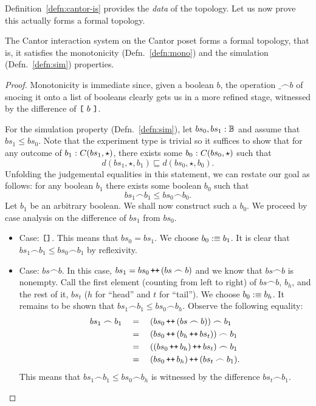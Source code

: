 Definition~\ref{defn:cantor-is} provides the \emph{data} of the topology. Let us now prove
this actually forms a formal topology.
\begin{thm}\label{thm:cantor-topo}
  The Cantor interaction system on the Cantor poset forms a formal topology, that is, it
  satisfies the monotonicity (Defn.~\ref{defn:mono}) and the simulation
  (Defn.~\ref{defn:sim}) properties.
\end{thm}
\begin{proof}
  Monotonicity is immediate since, given a boolean $b$, the operation $\_ \frown b$ of snocing
  it onto a list of booleans clearly gets us in a more refined stage, witnessed by the
  difference of $\text{\texttt{[}}~b~\text{\texttt{]}}$.

  For the simulation property (Defn.~\ref{defn:sim}), let
  $bs_0, bs_1:\mathbb{B}{}$ and assume that $bs_1 \le bs_0$. Note that the
  experiment type is trivial so it suffices to show that for any outcome of
  $b_1\hspace{0.1mm}:\hspace{0.1mm}C(bs_1, \star)$, there exists some $b_0\hspace{0.1mm}:\hspace{0.1mm}C(bs_0, \star)$ such that
  \begin{equation*}
    d(bs_1, \star, b_1) \sqsubseteq d(bs_0, \star, b_0).
  \end{equation*}
  Unfolding the judgemental equalities in this statement, we can restate our goal as
  follows: for any boolean $b_1$ there exists some boolean $b_0$ such that
  \begin{equation*}
    bs_1 \frown b_1 \le bs_0 \frown b_0.
  \end{equation*}
  Let $b_1$ be an arbitrary boolean. We shall now construct such a $b_0$. We proceed by
  case analysis on the difference of $bs_1$ from $bs_0$.
  \begin{itemize}
    \item Case: $\text{\texttt{[]}}{}$. This means that $bs_0 = bs_1$. We choose
      $b_0 :\equiv b_1$. It is clear that $bs_1 \frown b_1 \le bs_0 \frown b_1$ by reflexivity.
    \item Case: $bs \frown b$. In this case, $bs_1 = bs_0 \operatorname{\textnormal{\texttt{++}}}{} (bs \frown b)$ and we know that
      $bs \frown b$ is nonempty. Call the first element (counting from left to right) of $bs \frown
      b$, $b_h$, and the rest of it, $bs_t$ ($h$ for ``head'' and $t$ for ``tail''). We
      choose $b_0 :\equiv b_h$. It remains to be shown that $bs_1 \frown b_1 \le bs_0 \frown b_h$. Observe
      the following equality:
      \begin{align*}
        bs_1 \frown b_1 \quad&=\quad (bs_0 \operatorname{\textnormal{\texttt{++}}}{} (bs \frown b)) \frown b_1             \\
                   \quad&=\quad (bs_0 \operatorname{\textnormal{\texttt{++}}}{} (b_h \operatorname{\textnormal{\texttt{++}}}{} bs_t)) \frown b_1 \\
                   \quad&=\quad ((bs_0 \operatorname{\textnormal{\texttt{++}}}{} b_h) \operatorname{\textnormal{\texttt{++}}}{} bs_t) \frown b_1 \\
                   \quad&=\quad (bs_0 \operatorname{\textnormal{\texttt{++}}}{} b_h) \operatorname{\textnormal{\texttt{++}}}{} (bs_t \frown b_1) .
      \end{align*}
      This means that $bs_1 \frown b_1 \le bs_0 \frown b_h$ is witnessed by the difference
      $bs_t \frown b_1$.
  \end{itemize}
\end{proof}

